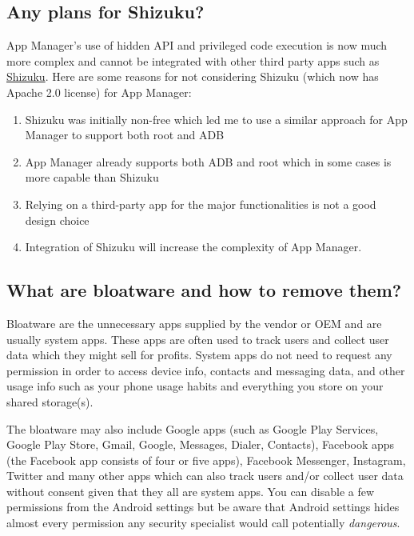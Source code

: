 \subsection{Any plans for Shizuku?} %
App Manager's use of hidden API and privileged code execution is now much more complex and cannot be integrated with
other third party apps such as \href{https://shizuku.rikka.app}{Shizuku}. Here are some reasons for not considering
Shizuku (which now has Apache 2.0 license) for App Manager:
\begin{enumerate}
    \item Shizuku was initially non-free which led me to use a similar approach for App Manager to support both root
    and ADB
    \item App Manager already supports both ADB and root which in some cases is more capable than Shizuku
    \item Relying on a third-party app for the major functionalities is not a good design choice
    \item Integration of Shizuku will increase the complexity of App Manager.
\end{enumerate}

\subsection{What are bloatware and how to remove them?}\label{subsec:faq:what-are-bloatware} %
Bloatware are the unnecessary apps supplied by the vendor or OEM and are usually system apps. These apps are often used
to track users and collect user data which they might sell for profits. System apps do not need to request any
permission in order to access device info, contacts and messaging data, and other usage info such as your phone usage
habits and everything you store on your shared storage(s).

The bloatware may also include Google apps (such as Google Play Services, Google Play Store, Gmail, Google, Messages,
Dialer, Contacts), Facebook apps (the Facebook app consists of four or five apps), Facebook Messenger, Instagram,
Twitter and many other apps which can also track users and/or collect user data without consent given that they all are
system apps. You can disable a few permissions from the Android settings but be aware that Android settings hides almost
every permission any security specialist would call potentially \emph{dangerous}.

